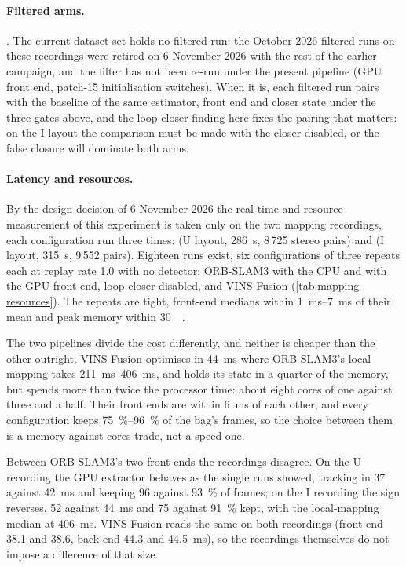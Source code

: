 \documentclass[11pt,a4paper,notitlepage]{report}
\begin{document}
\paragraph{Filtered arms.} . The current dataset set holds no
filtered run: the October 2026 filtered runs on these recordings were retired
on 6 November 2026 with the rest of the earlier campaign, and the filter has
not been re-run under the present pipeline (GPU front end, patch-15
initialisation switches). When it is, each filtered run pairs with the
baseline of the same estimator, front end and closer state under the three
gates above, and the loop-closer finding here fixes the pairing that matters:
on the I layout the comparison must be made with the closer disabled, or the
false closure will dominate both arms.

\paragraph{Latency and resources.} By the design decision of 6 November
2026 the real-time and resource measurement of this experiment is taken only
on the two mapping recordings, each configuration run three times:
 (U layout, \SI{286}{\second}, 8\,725
stereo pairs) and  (I layout,
\SI{315}{\second}, 9\,552 pairs). Eighteen runs exist, six configurations of
three repeats each at replay rate 1.0 with no detector: ORB-SLAM3 with the
CPU and with the GPU front end, loop closer disabled, and VINS-Fusion
(\cref{tab:mapping-resources}). The repeats are tight, front-end medians
within \SIrange{1}{7}{\milli\second} of their mean and peak memory within
\SI{30}{\mebi\byte}.

The two pipelines divide the cost differently, and neither is cheaper than
the other outright. VINS-Fusion optimises in \SI{44}{\milli\second} where
ORB-SLAM3's local mapping takes \SIrange{211}{406}{\milli\second}, and holds
its state in a quarter of the memory, but spends more than twice the
processor time: about eight cores of one against three and a half. Their
front ends are within \SI{6}{\milli\second} of each other, and every
configuration keeps \SIrange{75}{96}{\percent} of the bag's frames, so the
choice between them is a memory-against-cores trade, not a speed one.

Between ORB-SLAM3's two front ends the recordings disagree. On the U
recording the GPU extractor behaves as the single runs showed, tracking in
\SI{37}{} against \SI{42}{\milli\second} and keeping \SI{96}{} against
\SI{93}{\percent} of frames; on the I recording the sign reverses, \SI{52}{}
against \SI{44}{\milli\second} and \SI{75}{} against \SI{91}{\percent} kept,
with the local-mapping median at \SI{406}{\milli\second}. VINS-Fusion reads
the same on both recordings (front end \SI{38.1}{} and \SI{38.6}{},
back end \SI{44.3}{} and \SI{44.5}{\milli\second}), so the recordings
themselves do not impose a difference of that size.
\end{document}
